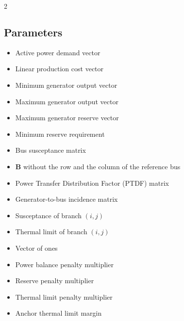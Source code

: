 \documentclass[12pt]{article}
\begin{document}
\begin{multicols}{2}
\subsection*{Parameters}
\begin{itemize}
    \item[$\boldsymbol{d}$] Active power demand vector
    \item[$\boldsymbol{c}$] Linear production cost vector
    \item[$\underline{\boldsymbol{p}}$] Minimum generator output vector
    \item[$\overline{\boldsymbol{p}}$] Maximum generator output vector
    \item[$\overline{\boldsymbol{r}}$] Maximum generator reserve vector
    \item[$R$] Minimum reserve requirement
    \item[$\boldsymbol{B}$] Bus susceptance matrix
    \item[$\boldsymbol{B}_r$] $\boldsymbol{B}$ without the row and the column of the reference bus
    \item[$\boldsymbol{\Phi}$] Power Transfer Distribution Factor (PTDF) matrix
    \item[$\boldsymbol{C}_g$] Generator-to-bus incidence matrix
    \item[$b_{ij}$] Susceptance of branch $(i,j)$
    \item[$\overline{P}_{ij}$] Thermal limit of branch $(i,j)$
    \item[$\mathbf{e}$] Vector of ones
    \item[$M_{pb}$] Power balance penalty multiplier
    \item[$M_{res}$] Reserve penalty multiplier
    \item[$M_{th}$] Thermal limit penalty multiplier
    \item[$\delta$] Anchor thermal limit margin
\end{itemize}

\end{multicols}
\end{document}
